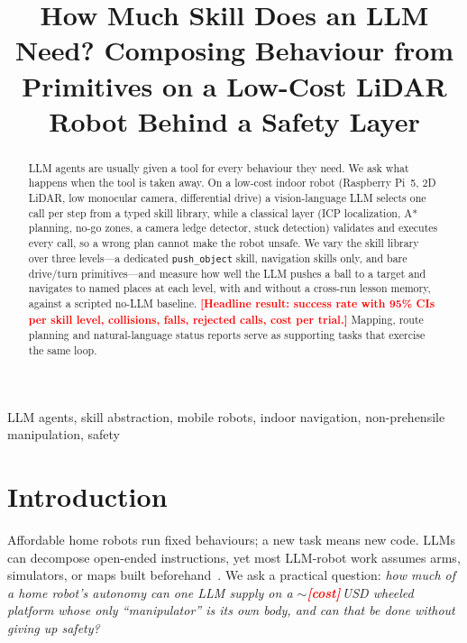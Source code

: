 \documentclass[conference]{IEEEtran}
\newcommand{\todo}[1]{\textcolor{red}{\textbf{[#1]}}}
\begin{document}
\title{How Much Skill Does an LLM Need? Composing Behaviour from Primitives on a Low-Cost LiDAR Robot Behind a Safety Layer}

\author{
\IEEEauthorblockA{\todo{affiliation}\\ sharma.priyankraj@gmail.com}}

\maketitle

\begin{abstract}
LLM agents are usually given a tool for every behaviour they need. We ask what happens when the tool is taken away.
On a low-cost indoor robot (Raspberry Pi~5, 2D LiDAR, low monocular camera, differential drive) a vision-language LLM selects one call per step from a typed skill library,
while a classical layer (ICP localization, A* planning, no-go zones, a camera ledge detector, stuck detection) validates and executes every call, so a wrong plan cannot make the robot unsafe.
We vary the skill library over three levels---a dedicated \texttt{push\_object} skill, navigation skills only, and bare drive/turn primitives---and measure how well the LLM
pushes a ball to a target and navigates to named places at each level, with and without a cross-run lesson memory, against a scripted no-LLM baseline.
\todo{Headline result: success rate with 95\% CIs per skill level, collisions, falls, rejected calls, cost per trial.}
Mapping, route planning and natural-language status reports serve as supporting tasks that exercise the same loop.
\end{abstract}

\begin{IEEEkeywords}
LLM agents, skill abstraction, mobile robots, indoor navigation, non-prehensile manipulation, safety
\end{IEEEkeywords}

\section{Introduction}
Affordable home robots run fixed behaviours; a new task means new code. LLMs can decompose open-ended instructions, yet most LLM-robot work assumes arms, simulators,
or maps built beforehand~\cite{saycan,codeaspolicies,innermonologue}. We ask a practical question: \emph{how much of a home robot's autonomy can one LLM supply on a
$\sim$\todo{cost}\,USD wheeled platform whose only ``manipulator'' is its own body, and can that be done without giving up safety?}
\end{document}
